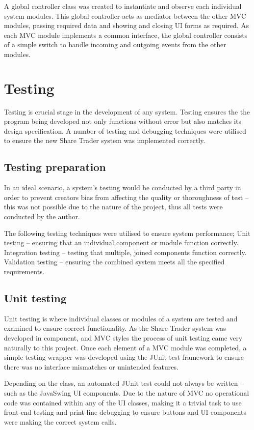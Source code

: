 \documentclass[12pt, a4paper,titlepage]{article}
\begin{document}
A global controller class was created to instantiate and observe each
individual system modules. This global controller acts as mediator between the
other MVC modules, passing required data and showing and closing UI forms as
required.  As each MVC module implements a common interface, the global
controller consists of a simple switch to handle incoming and outgoing events
from the other modules.

\section{Testing}
Testing is crucial stage in the development of any system. Testing ensures the
the program being developed not only functions without error but also matches
its design specification. A number of testing and debugging techniques were
utilised to ensure the new Share Trader system was implemented correctly.

\subsection{Testing preparation}
In an ideal scenario, a system’s testing would be conducted by a third party
in order to prevent creators bias from affecting the quality or thoroughness
of test – this was not possible due to the nature of the project, thus all
tests were conducted by the author.

The following testing techniques were utilised to ensure system performance;
Unit testing – ensuring that an individual component or module function
correctly.
Integration testing – testing that multiple, joined components function
correctly.  Validation testing – ensuring the combined system meets all the
specified requirements.

\subsection{Unit testing}
Unit testing is where individual classes or modules of a system are tested and
examined to ensure correct functionality. As the Share Trader system was
developed in component, and MVC styles the process of unit testing came very
naturally to this project.  Once each element of a MVC module was completed, a
simple testing wrapper was developed  using the JUnit test framework to ensure
there was no interface mismatches or unintended features.

Depending on the class, an automated JUnit test could not always be written –
such as the JavaSwing UI components. Due to the nature of MVC no operational
code was contained within any of the UI classes, making it a trivial task to
use front-end testing and print-line debugging to ensure buttons and UI
components were making the correct system calls.
\end{document}
